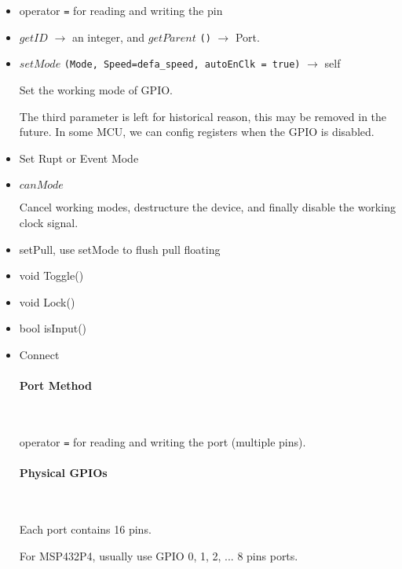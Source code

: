 \begin{itemize}
\item operator \verb`=` for reading and writing the pin

\item $getID$ $\rightarrow$ an integer, and $getParent$ \verb`()` $\rightarrow$ {Port}.

\item $setMode$ \verb`(Mode, Speed=defa_speed, autoEnClk = true)` $\rightarrow$ self

Set the working mode of GPIO.

The third parameter is left for historical reason, this may be removed in the future. In some MCU, we can config registers when the GPIO is disabled. %

\item Set Rupt or Event Mode

\item $canMode$

Cancel working modes, destructure the device, and finally disable the working clock signal.

\item setPull, use setMode to flush pull floating

\item void Toggle()

\item void Lock()

\item bool isInput()

\item Connect %

\paragraph{Port Method} \

operator \verb`=` for reading and writing the port (multiple pins).

\paragraph{Physical GPIOs} \

Each port contains 16 pins.

For MSP432P4, usually use GPIO 0, 1, 2, ... 8 pins ports.


\end{itemize}
